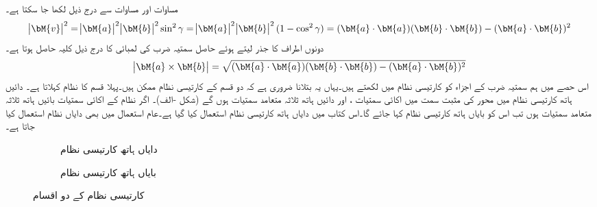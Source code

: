 مساوات  اور مساوات  سے درج ذیل لکھا جا سکتا ہے۔
\begin{align*}
\abs{\bM{v}}^2=\abs{\bM{a}}^2\abs{\bM{b}}^2\sin^2\gamma=\abs{\bM{a}}^2\abs{\bM{b}}^2(1-\cos^2\gamma)=(\bM{a}\cdot\bM{a})(\bM{b}\cdot\bM{b})-(\bM{a}\cdot\bM{b})^2
\end{align*}
دونوں اطراف کا جذر لیتے ہوئے حاصل سمتیہ ضرب کی لمبائی کا درج ذیل کلیہ حاصل ہوتا ہے۔
\begin{align}\label{مساوات_الجبرا_سمتی_ضرب_معیار_کی_اہم_مساوات}
\abs{\bM{a}\times \bM{b}}=\sqrt{(\bM{a}\cdot\bM{a})(\bM{b}\cdot\bM{b})-(\bM{a}\cdot\bM{b})^2}
\end{align}
اس حصے میں ہم سمتیہ ضرب کے اجزاء کو کارتیسی نظام میں لکھتے ہیں۔یہاں یہ بتلانا ضروری ہے کہ دو قسم کے کارتیسی نظام ممکن ہیں۔پہلا قسم   کا نظام کہلاتا ہے۔ دائیں ہاتھ کارتیسی نظام میں محور کی مثبت سمت میں اکائی سمتیات ،  اور  دائیں ہاتھ ثلاثہ  متعامد سمتیات ہوں گے (شکل -الف)۔ اگر نظام کے اکائی سمتیات بائیں ہاتھ ثلاثہ متعامد سمتیات ہوں تب اس کو بایاں ہاتھ کارتیسی نظام کہا جائے گا۔اس کتاب میں دایاں ہاتھ کارتیسی نظام استعمال کیا گیا ہے۔عام استعمال میں بھی دایاں نظام استعمال کیا جاتا ہے۔ 
\begin{figure}
\centering
\begin{subfigure}{0.45\textwidth}
\centering
{}
\caption{ دایاں ہاتھ کارتیسی نظام}
\end{subfigure} \hfill
\begin{subfigure}{0.45\textwidth}
\centering
{}
\caption{ بایاں ہاتھ کارتیسی نظام}
\end{subfigure}
\caption{کارتیسی نظام کے دو اقسام}
\label{شکل_الجبرا_کارتیسی_بایاں_دایاں_نظام}
\end{figure}

